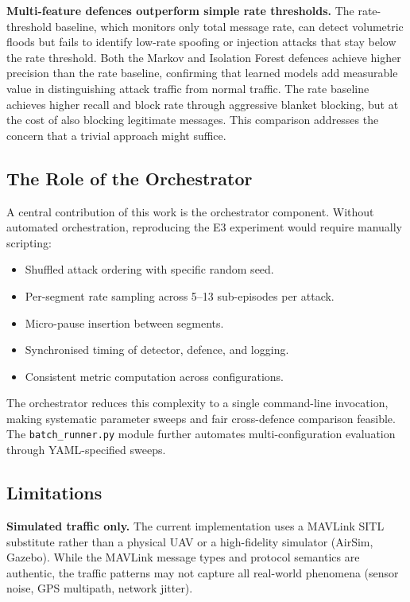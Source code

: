 \textbf{Multi-feature defences outperform simple rate thresholds.}
The rate-threshold baseline, which monitors only total message rate, can detect volumetric floods but fails to identify low-rate spoofing or injection attacks that stay below the rate threshold.
Both the Markov and Isolation Forest defences achieve higher precision than the rate baseline, confirming that learned models add measurable value in distinguishing attack traffic from normal traffic.
The rate baseline achieves higher recall and block rate through aggressive blanket blocking, but at the cost of also blocking legitimate messages.
This comparison addresses the concern that a trivial approach might suffice.

\subsection{The Role of the Orchestrator}

A central contribution of this work is the orchestrator component.
Without automated orchestration, reproducing the E3 experiment would require manually scripting:
\begin{itemize}
    \item Shuffled attack ordering with specific random seed.
    \item Per-segment rate sampling across 5--13 sub-episodes per attack.
    \item Micro-pause insertion between segments.
    \item Synchronised timing of detector, defence, and logging.
    \item Consistent metric computation across configurations.
\end{itemize}

The orchestrator reduces this complexity to a single command-line invocation, making systematic parameter sweeps and fair cross-defence comparison feasible.
The \texttt{batch\_runner.py} module further automates multi-configuration evaluation through YAML-specified sweeps.

\subsection{Limitations}

\textbf{Simulated traffic only.}
The current implementation uses a MAVLink SITL substitute rather than a physical UAV or a high-fidelity simulator (AirSim, Gazebo).
While the MAVLink message types and protocol semantics are authentic, the traffic patterns may not capture all real-world phenomena (sensor noise, GPS multipath, network jitter).


